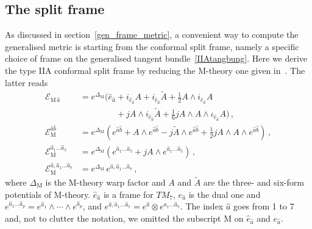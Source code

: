 \documentclass[debug]{phd}
\begin{document}
			\subsection{The split frame}\label{splitfr_MtoIIA}
				As discussed in section~\ref{gen_frame_metric}, a convenient way to compute the generalised metric is starting from the conformal split frame, namely a specific choice of frame on the generalised tangent bundle~\eqref{IIAtangbung}. 
				Here we derive the type IIA conformal split frame by reducing the M-theory one given in~\cite{Coimbra:2011ky}. 
				The latter reads
						\begin{equation}\label{eq:geom-basis}
							\begin{split}
							\mathcal{E}_{{\mathrm{M}} \, \hat{a}} &= e^{\Delta_{\mathrm{M}}} \Big( \hat{e}_{\hat{a}} + i_{\hat{e}_{\hat{a}}} A + i_{\hat{e}_{\hat{a}}} \tilde A + \tfrac{1}{2} A \wedge i_{\hat{e}_{\hat{a}}} A \\
														&\phantom{= e^{\Delta_{\mathrm{M}}} \Big( \hat{e}_{\hat{a}}} + j A \wedge i_{\hat{e}_{\hat{a}}}\tilde{A} + \tfrac{1}{6} j A \wedge A \wedge \iota_{\hat{e}_{\hat{a}}} A \Big) \, , \\
 							\mathcal{E}_{\mathrm{M}}^{\hat{a}\hat{b}} &= e^{\Delta_{\mathrm{M}}} \left( e^{\hat{a}\hat{b}} + A \wedge e^{\hat{a}\hat{b}} - j \tilde{A}\wedge e^{\hat{a}\hat{b}} + \tfrac{1}{2}j A \wedge A \wedge e^{\hat{a}\hat{b}} \right)\, , \\
							\mathcal{E}_{\mathrm{M}}^{\hat{a}_1\dots \hat{a}_5} &= e^{\Delta_{\mathrm{M}}} \left( e^{\hat{a}_1\dots \hat{a}_5} + j A \wedge e^{\hat{a}_1\dots \hat{a}_5} \right)\, , \\
 							\mathcal{E}_{\mathrm{M}}^{\hat{a},\hat{a}_1\dots \hat{a}_7} &= e^{\Delta_{\mathrm{M}}}\, e^{\hat{a},\hat{a}_1\dots \hat{a}_7}\, ,
							\end{split}
						\end{equation}
				where $\Delta_{\mathrm{M}}$ is the M-theory warp factor and $A$ and $\tilde A$ are the three- and six-form potentials of M-theory. 
				$\hat{e}_{\hat{a}}$ is a frame for $T M_7$, $e_{\hat{a}} $ is the dual one and $e^{\hat{a}_1\ldots \hat{a}_p}= e^{\hat{a}_1}\wedge \cdots \wedge e^{\hat{a}_p}$, and $e^{\hat{a},\hat{a}_1\ldots \hat{a}_7} = e^{\hat{a}}\otimes e^{\hat{a}_1\ldots \hat{a}_7}$. 
				The index $\hat{a}$ goes from 1 to 7 and, not to clutter the notation, we omitted the subscript M on $\hat{e}_{\hat{a}} $ and $e_{\hat{a}}$.
\end{document}
